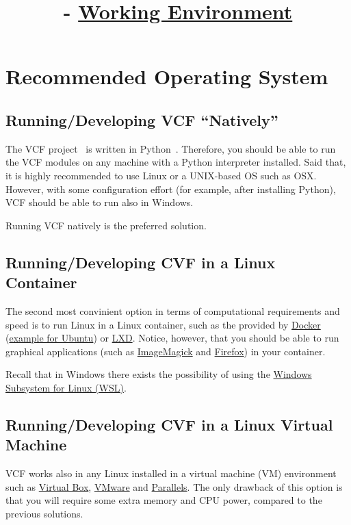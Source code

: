 

\title{\SM{} - \href{https://github.com/Sistemas-Multimedia/Sistemas-Multimedia.github.io/tree/master/contents/working_environment}{Working Environment}}

\maketitle

\tableofcontents

\section{Recommended Operating System}

\subsection{Running/Developing VCF ``Natively''}
The VCF project~\cite{vruiz__VCF} is written in
Python~\cite{python}. Therefore, you should be able to run the VCF
modules on any machine with a Python interpreter installed. Said that,
it is highly recommended to use Linux or a UNIX-based OS such as
OSX. However, with some configuration effort (for example, after
installing Python), VCF should be able to run also in Windows.

Running VCF natively is the preferred solution.

\subsection{Running/Developing CVF in a Linux Container}
The second most convinient option in terms of computational
requirements and speed is to run Linux in a Linux container, such
as the provided by \href{https://hub.docker.com/}{Docker}
(\href{https://hub.docker.com/_/ubuntu}{example for Ubuntu})
or \href{https://linuxcontainers.org/}{LXD}. Notice, however, that you
should be able to run graphical applications (such
as \href{https://linuxcontainers.org/}{ImageMagick}
and \href{https://www.mozilla.org/firefox}{Firefox}) in your
container.

Recall that in Windows there exists the possibility of using the
\href{https://learn.microsoft.com/en-us/windows/wsl/install}{Windows
  Subsystem for Linux (WSL)}.

\subsection{Running/Developing CVF in a Linux Virtual Machine}
VCF works also in any Linux installed in a virtual machine (VM)
environment such as \href{https://www.virtualbox.org/}{Virtual Box},
\href{https://www.vmware.com/}{VMware} and \href{https://www.vmware.com/}{Parallels}.
The only drawback of this option is that you will require
some extra memory and CPU power, compared to the previous solutions.


